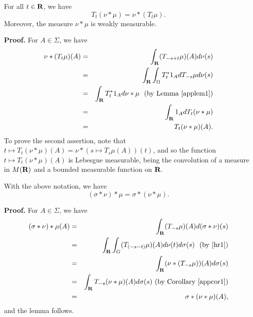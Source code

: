 \begin{appcor1}
For all $t\in \R$, we have
$$T_t(\nu*\mu)=\nu*(T_t\mu).$$ 
Moreover, the measure $\nu*\mu$ is weakly measurable.
\label{appcor1}
\end{appcor1}
{\bf Proof.}  For $A\in \Sigma$, we have
\begin{eqnarray*}
\nu *(T_t\mu)(A)        &=&     \int_\R (T_{-s +t}\mu)(A)d\nu(s)\\
			&=&     \int_\R\int_\Omega 
				T^*_t 1_A dT_{-s}\mu d\nu (s)\\
			&=&     \int_\R T^*_t1_A d\nu*\mu \ \ 
				({\rm by\ Lemma\ \ref{applem1}})\\
			&=&     \int_\R 1_A dT_t(\nu*\mu)\\
			&=&     T_t(\nu*\mu)(A).
\end{eqnarray*} 
To prove the second assertion, 
note that 
$t\mapsto T_t(\nu*\mu)(A)=\nu*(s\mapsto T_s\mu(A))(t)$, 
and so the function $t\mapsto T_t(\nu*\mu)(A)$ 
is Lebesgue measurable, being the convolution of a measure 
in $M(\R)$ and a bounded measurable function on $\R$.

\begin{appcor2}
With the above notation, we have
$$(\sigma*\nu)*\mu=\sigma*(\nu*\mu).$$
\label{appcor2}
\end{appcor2}
{\bf Proof.}  For $A\in \Sigma$, we have
\begin{eqnarray*}
(\sigma*\nu)*\mu(A)     &=&     
\int_\R(T_{-s}\mu)(A)d(\sigma*\nu)(s)\\
			&=&     
\int_\R\int_G(T_{(-s-t)}\mu)(A)d\nu(t)d\sigma(s)
	       \ \ ({\rm by\ \cite[Theorem\ (19.10)]{hr1}})\\
			&=&     \int_\R (\nu*(T_{-s}\mu))(A)d\sigma(s)\\
			&=&     \int_\R T_{-s} (\nu*\mu)(A)d\sigma(s)
				\ ({\rm by\ Corollary\  \ref{appcor1}})\\
			&=&     \sigma*(\nu*\mu)(A),
\end{eqnarray*}
and the lemma follows.


